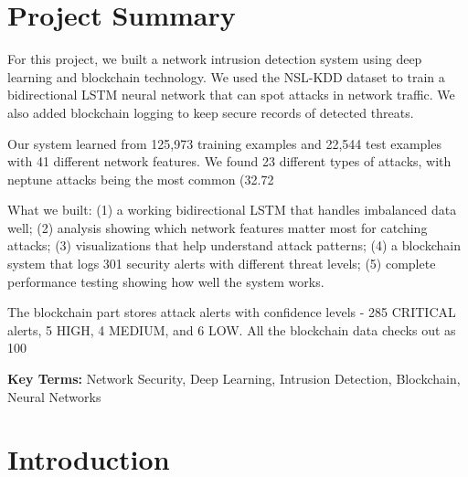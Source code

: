 \documentclass[12pt,a4paper]{report}
\begin{document}
\chapter*{Project Summary}

For this project, we built a network intrusion detection system using deep learning and blockchain technology. We used the NSL-KDD dataset to train a bidirectional LSTM neural network that can spot attacks in network traffic. We also added blockchain logging to keep secure records of detected threats.

Our system learned from 125,973 training examples and 22,544 test examples with 41 different network features. We found 23 different types of attacks, with neptune attacks being the most common (32.72%

What we built: (1) a working bidirectional LSTM that handles imbalanced data well; (2) analysis showing which network features matter most for catching attacks; (3) visualizations that help understand attack patterns; (4) a blockchain system that logs 301 security alerts with different threat levels; (5) complete performance testing showing how well the system works.

The blockchain part stores attack alerts with confidence levels - 285 CRITICAL alerts, 5 HIGH, 4 MEDIUM, and 6 LOW. All the blockchain data checks out as 100%

\textbf{Key Terms:} Network Security, Deep Learning, Intrusion Detection, Blockchain, Neural Networks

\tableofcontents

\chapter{Introduction}
\end{document}
